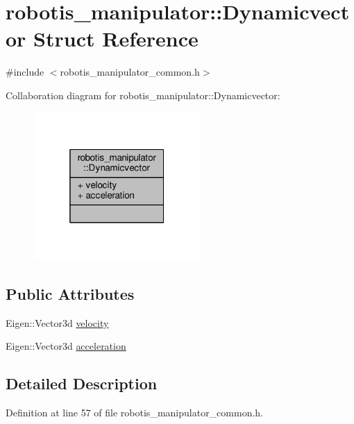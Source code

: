 \hypertarget{structrobotis__manipulator_1_1_dynamicvector}{}\section{robotis\+\_\+manipulator\+:\+:Dynamicvector Struct Reference}
\label{structrobotis__manipulator_1_1_dynamicvector}


{\ttfamily \#include $<$robotis\+\_\+manipulator\+\_\+common.\+h$>$}



Collaboration diagram for robotis\+\_\+manipulator\+:\+:Dynamicvector\+:\nopagebreak
\begin{figure}[H]
\begin{center}
\leavevmode
\includegraphics[width=181pt]{structrobotis__manipulator_1_1_dynamicvector__coll__graph}
\end{center}
\end{figure}
\subsection*{Public Attributes}
\begin{DoxyCompactItemize}
\item 
Eigen\+::\+Vector3d \hyperlink{structrobotis__manipulator_1_1_dynamicvector_a6bbccf8316887a8da3cd6aa065f3beac}{velocity}
\item 
Eigen\+::\+Vector3d \hyperlink{structrobotis__manipulator_1_1_dynamicvector_afc83eba2d67af4c23150a08824f0f01e}{acceleration}
\end{DoxyCompactItemize}


\subsection{Detailed Description}


Definition at line 57 of file robotis\+\_\+manipulator\+\_\+common.\+h.



